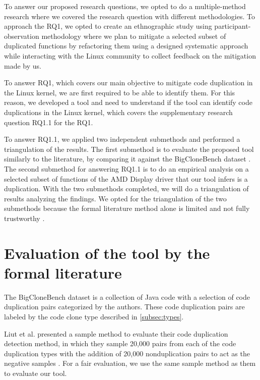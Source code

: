 \en

To answer our proposed research questions, we opted to do a multiple-method research 
where we covered the research question with different methodologies. To approach the RQ1, 
we opted to create an ethnographic study using participant-observation methodology where 
we plan to mitigate a selected subset of duplicated functions by refactoring them using 
a designed systematic approach while interacting with the Linux community to collect 
feedback on the mitigation made by us.


To answer RQ1, which covers our main objective to mitigate code duplication in the Linux 
kernel, we are first required to be able to identify them. For this reason, we developed 
a tool and need to understand if the tool can identify code duplications in the Linux kernel, 
which covers the supplementary research question RQ1.1 for the RQ1.

To answer RQ1.1, we applied two independent submethods and performed a triangulation of 
the results. The first submethod is to evaluate the proposed tool similarly to the literature, 
by comparing it against the BigCloneBench dataset \citep{bigclonebench}. The second submethod
for answering RQ1.1 is to do an empirical analysis on a selected subset of functions of the 
AMD Display driver that our tool infers is a duplication. With the two submethods completed, 
we will do a triangulation of results analyzing the findings. We opted for the triangulation 
of the two submethods because the formal literature method alone is limited and not fully 
trustworthy \citep{bigfail, litreview}.

\section{Evaluation of the tool by the formal literature}

\label{sec:metbig}

The BigCloneBench dataset \citep{bigclonebench} is a collection of Java code with a selection of
code duplication pairs categorized by the authors. These code duplication pairs are labeled by 
the code clone type described in \ref{subsec:types}.

Liut et al. presented a sample method to evaluate their code duplication detection method, 
in which they sample 20,000 pairs from each of the code duplication types with the addition 
of 20,000 nonduplication pairs to act as the negative samples \citep{tailor}. 
For a fair evaluation, we use the same sample method as them to evaluate our tool.

